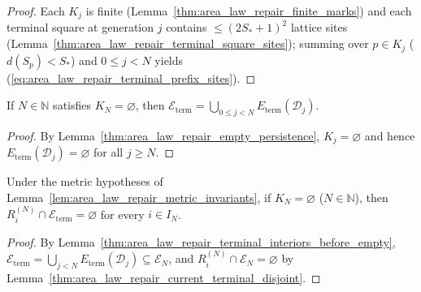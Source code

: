\begin{proof}
    \leanok
    Each $K_j$ is finite (Lemma~\ref{thm:area_law_repair_finite_marks}) and each terminal square at
    generation $j$ contains $\le(2S_*+1)^2$ lattice sites
    (Lemma~\ref{thm:area_law_repair_terminal_square_sites}); summing over $p\in K_j$ ($d(S_p)<S_*$)
    and $0\le j<N$ yields (\ref{eq:area_law_repair_terminal_prefix_sites}).
\end{proof}
\begin{lemma}
    \label{thm:area_law_repair_terminal_interiors_before_empty}
    \leanok
    If $N\in\mathbb N$ satisfies $K_N=\varnothing$, then
    $\mathcal E_{\mathrm{term}}=\bigcup_{0\le j<N}E_{\mathrm{term}}(\mathcal D_j)$.
\end{lemma}

\begin{proof}\leanok
    By Lemma~\ref{thm:area_law_repair_empty_persistence}, $K_j=\varnothing$ and hence
    $E_{\mathrm{term}}(\mathcal D_j)=\varnothing$ for all $j\ge N$.
\end{proof}

\begin{lemma}
    \label{thm:area_law_repair_current_terminal_empty}
    \leanok
    Under the metric hypotheses of Lemma~\ref{lem:area_law_repair_metric_invariants}, if
    $K_N=\varnothing$ ($N\in\mathbb N$), then $R_i^{(N)}\cap\mathcal E_{\mathrm{term}}=\varnothing$
    for every $i\in I_N$.
\end{lemma}

\begin{proof}
    \leanok
    By Lemma~\ref{thm:area_law_repair_terminal_interiors_before_empty},
    $\mathcal E_{\mathrm{term}}=\bigcup_{j<N}E_{\mathrm{term}}(\mathcal D_j)\subseteq\mathcal E_N$,
    and $R_i^{(N)}\cap\mathcal E_N=\varnothing$ by Lemma~\ref{thm:area_law_repair_current_terminal_disjoint}.
\end{proof}

